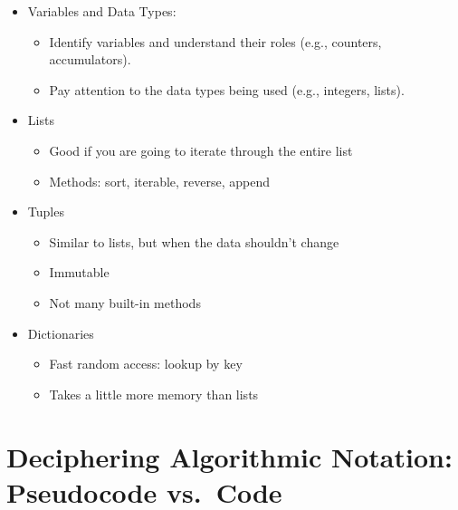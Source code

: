 \documentclass[
  letterpaper,
  DIV=11,
  numbers=noendperiod]{scrreprt}
\providecommand{\tightlist}{%
  \setlength{\itemsep}{0pt}\setlength{\parskip}{0pt}}\usepackage{longtable,booktabs,array}
\begin{document}
\begin{itemize}
\tightlist
\item
  Variables and Data Types:

  \begin{itemize}
  \tightlist
  \item
    Identify variables and understand their roles (e.g., counters,
    accumulators).
  \item
    Pay attention to the data types being used (e.g., integers, lists).
  \end{itemize}
\item
  Lists

  \begin{itemize}
  \tightlist
  \item
    Good if you are going to iterate through the entire list
  \item
    Methods: sort, iterable, reverse, append
  \end{itemize}
\item
  Tuples

  \begin{itemize}
  \tightlist
  \item
    Similar to lists, but when the data shouldn't change
  \item
    Immutable
  \item
    Not many built-in methods
  \end{itemize}
\item
  Dictionaries

  \begin{itemize}
  \tightlist
  \item
    Fast random access: lookup by key
  \item
    Takes a little more memory than lists
  \end{itemize}
\end{itemize}

\section{Deciphering Algorithmic Notation: Pseudocode
vs.~Code}\label{deciphering-algorithmic-notation-pseudocode-vs.-code}
\end{document}
